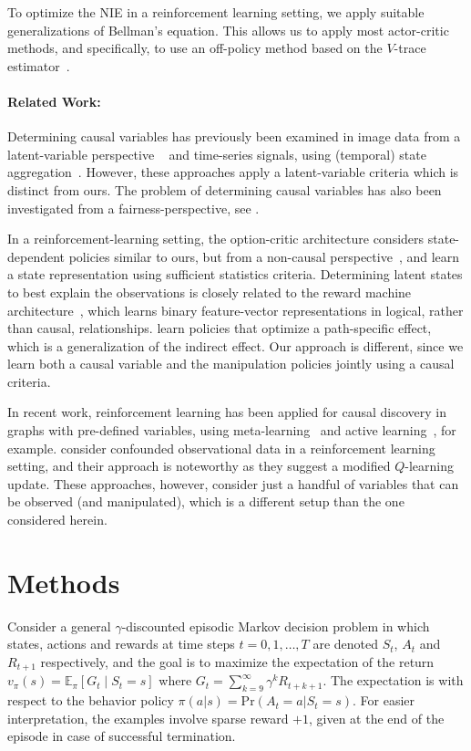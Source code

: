 \documentclass[letterpaper]{article} %
\newcommand{\EE}{\mathbb{E}}
\newcommand{\NIE}{\textrm{NIE}\xspace}
\begin{document}
	To optimize the \NIE in a reinforcement learning setting, we apply suitable generalizations of Bellman's equation. This allows us to apply most actor-critic methods, and specifically, to use an off-policy method based on the $V$-trace estimator~\cite{espeholt2018impala}. 
	
	
	\paragraph{Related Work:} Determining causal variables has previously been examined in image data from a latent-variable perspective ~\cite{besserve2018counterfactuals,lopez2017discovering} and time-series signals, using (temporal) state aggregation~\cite{zhang2015multi}. However, these approaches apply a latent-variable criteria which is distinct from ours. The problem of determining causal variables has also been investigated from a fairness-perspective, see \citet{zhang2018fairness}.
	
	
	In a reinforcement-learning setting, the option-critic architecture considers state-dependent policies similar to ours, but from a non-causal perspective~\citet{bacon2017option}, and \citet{zhang2019learning} learn a state representation using sufficient statistics criteria. Determining latent states to best explain the observations is closely related to the reward machine architecture~\cite{camacho2019ltl,icarte2018using}, which learns binary feature-vector representations in logical, rather than causal, relationships. \citet{Nabi_Kanki_Shpitser_2018} learn policies that optimize a path-specific effect, which is a generalization of the indirect effect. Our approach is different, since we learn both a causal variable and the manipulation policies jointly using a causal criteria.
	
	In recent work, reinforcement learning has been applied for causal discovery in graphs with pre-defined variables, using meta-learning~\cite{dasgupta2019causal} and active learning~\cite{amirinezhad2020active}, for example. \citet{Wang2020ProvablyEC} consider confounded observational data in a reinforcement learning setting, and their approach is noteworthy as they suggest a modified $Q$-learning update. These approaches, however, consider just a handful of variables that can be observed (and manipulated), which is a different setup than the one considered herein. 
	
	
	
	\section{Methods} \label{methods}
	Consider a general $\gamma$-discounted episodic Markov decision problem in which states, actions and rewards at time steps $t=0,1,\dots,T$ are denoted $S_t$, $A_t$ and $R_{t+1}$ respectively, and the goal is to maximize the expectation of the return $v_\pi(s) = \EE_{\pi}\left[ G_t \mid S_t=s \right]$ where $G_t = \sum_{k=9}^\infty \gamma^k R_{t+k+1}$. The expectation is with respect to the behavior policy $\pi(a|s) = \textrm{Pr}(A_t=a | S_t=s)$. For easier interpretation, the examples involve sparse reward $+1$, given at the end of the episode in case of successful termination.
	
\end{document}
